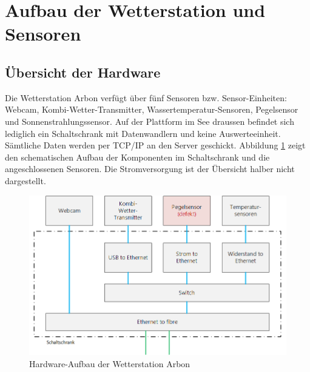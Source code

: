 \section{Aufbau der Wetterstation und Sensoren}


\subsection{Übersicht der Hardware}
Die Wetterstation Arbon verfügt über fünf Sensoren bzw. Sensor-Einheiten: Webcam, Kombi-Wetter-Transmitter, Wassertemperatur-Sensoren, Pegelsensor und Sonnenstrahlungssensor. Auf der Plattform im See draussen befindet sich lediglich ein Schaltschrank mit Datenwandlern und keine Auswerteeinheit. Sämtliche Daten werden per TCP/IP an den Server geschickt. Abbildung \ref{img:schaltschrank} zeigt den schematischen Aufbau der Komponenten im Schaltschrank und die angeschlossenen Sensoren. Die Stromversorgung ist der Übersicht halber nicht dargestellt.

\newline

\begin{figure}[ht]
	\centering
	\includegraphics[width=0.9\linewidth]{img/schaltschrank.png}
	\caption{Hardware-Aufbau der Wetterstation Arbon}
	\label{img:schaltschrank}
\end{figure}

